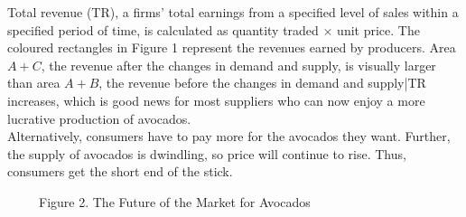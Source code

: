 \documentclass[12pt]{article}
\begin{document}
	Total revenue (TR), a firms' total earnings from a specified level of sales within a specified period of time, is calculated as quantity traded $\times$ unit price. The coloured rectangles in Figure 1 represent the revenues earned by producers. Area $A + C$, the revenue after the changes in demand and supply, is visually larger than area $A + B$, the revenue before the changes in demand and supply|TR increases, which is good news for most suppliers who can now enjoy a more lucrative production of avocados. \\
	
	Alternatively, consumers have to pay more for the avocados they want. Further, the supply of avocados is dwindling, so price will continue to rise. Thus, consumers get the short end of the stick.	
	
		\begin{center}

\ \ \ \ \ Figure 2. The Future of the Market for Avocados

\vspace{0.5\baselineskip}

\end{center}
\end{document}
